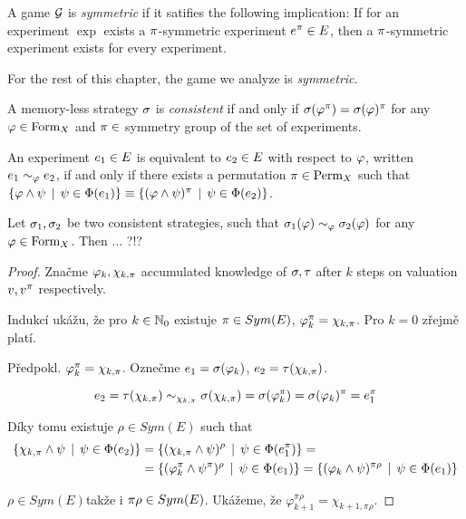 \begin{definition}
A game $\mathcal{G}$ is \emph{symmetric} if it satifies the following implication:
If for an experiment $\exp$ exists a $\pi$-symmetric experiment $e^\pi\in E$,
  then a $\pi$-symmetric experiment exists for every experiment.
\end{definition}

For the rest of this chapter, the game we analyze is \emph{symmetric}.

\begin{definition}
A memory-less strategy $\sigma$ is \emph{consistent} if and only if
  $\sigma(\varphi^\pi) = \sigma(\varphi)^\pi$ for any $\varphi\in\textrm{Form}_X$ and
  $\pi\in$ symmetry group of the set of experiments.
\end{definition}

\begin{definition}
An experiment $e_1\in E$ is equivalent to $e_2\in E$ with respect to $\varphi$,
  written $e_1\sim_\varphi e_2$,
  if and only if there exists a permutation $\pi\in\textrm{Perm}_X$ such that
 $ \{ \varphi\wedge\psi \:\:|\:\: \psi\in\Phi(e_1) \} \equiv
   \{ (\varphi\wedge\psi)^\pi \:\:|\:\: \psi\in\Phi(e_2) \} $.
\end{definition}

\begin{theorem}
Let $\sigma_1, \sigma_2$ be two consistent strategies, such that
$\sigma_1(\varphi) \sim_\varphi \sigma_2(\varphi)$ for any $\varphi\in\textrm{Form}_X$.
Then ... ?!? %
\end{theorem}

\begin{proof}
\newcommand{\knA}{\varphi}
\newcommand{\knB}{\chi}
Značme $\knA_k, \knB_{k,\perm}$ accumulated knowledge of $\sigma, \tau$ after $k$ steps on valuation $v, v^\pi$ respectively.

Indukcí ukážu, že pro $k\in\mathbb{N}_0$ existuje $\pi\in Sym(E)$, $\knA_k^\perm = \knB_{k,\perm}$.
Pro $k=0$ zřejmě platí. 

Předpokl. $\knA_k^\perm = \knB_{k, \perm}$.
Oznečme $e_1 = \stg(\knA_k)$, $e_2 = \tau(\knB_{k, \perm})$.

\[
e_2 = \tau(\knB_{k, \perm})
    \sim_{\knB_{k, \perm}}   \stg(\knB_{k, \perm})
    = \stg(\knA_k^\perm)
    = \stg(\knA_k)^\perm
    = e_1^\perm
\]

Díky tomu existuje $\rho\in Sym(E)$ such that
\begin{align}
 \{ \knB_{k, \perm} \wedge \formu \| \formu\in\outcome(\exp_2) \} &=
 \{ (\knB_{k, \perm} \wedge \formu)^\rho \| \formu\in\outcome(\exp_1^\perm) \} = \\
&= \{ (\knA_k^\perm \wedge \formu^\perm)^\rho \| \formu\in\outcome(\exp_1) \} =
 \{ (\knA_k \wedge \formu)^{\pi\rho} \| \formu\in\outcome(\exp_1) \} \\
\end{align}

$\rho\in Sym(E)$takže i $\pi\rho\in Sym(E)$. Ukážeme, že
$\knA_{k+1}^{\pi\rho} = \knB_{k+1, \pi\rho}$.



\end{proof}

